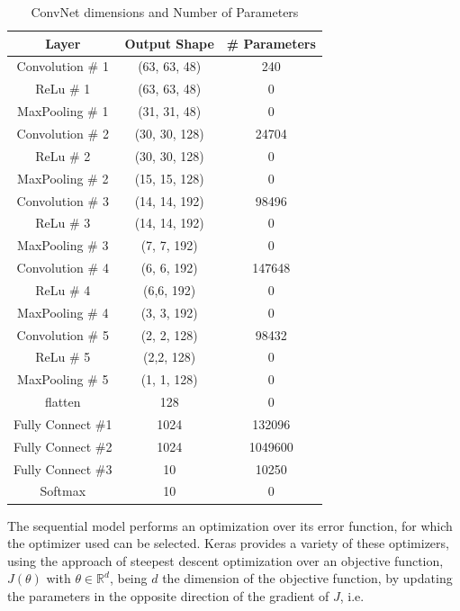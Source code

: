 \begin{table}[h!]
    \centering
    \begin{tabular}{|c|c|c|}
        \hline
        \textbf{Layer} & \textbf{Output Shape} & \textbf{\# Parameters} \\
        \hline\hline
        Convolution \# 1 & (63, 63, 48) & 240 \\\hline
        ReLu \# 1 & (63, 63, 48) & 0 \\\hline
        MaxPooling \# 1 & (31, 31, 48) & 0 \\\hline
        Convolution \# 2 & (30, 30, 128) & 24704 \\\hline
        ReLu \# 2 & (30, 30, 128) & 0 \\\hline
        MaxPooling \# 2 & (15, 15, 128) & 0 \\\hline
        Convolution \# 3 & (14, 14, 192) & 98496 \\\hline
        ReLu \# 3 & (14, 14, 192) & 0 \\\hline
        MaxPooling \# 3 & (7, 7, 192) & 0 \\\hline
        Convolution \# 4 & (6, 6, 192) & 147648 \\\hline
        ReLu \# 4 & (6,6, 192) & 0 \\\hline
        MaxPooling \# 4 & (3, 3, 192) & 0 \\\hline
        Convolution \# 5 & (2, 2, 128) & 98432 \\\hline
        ReLu \# 5 & (2,2, 128) & 0 \\\hline
        MaxPooling \# 5 & (1, 1, 128) & 0 \\\hline
        flatten & 128 & 0 \\\hline
        Fully Connect \#1 & 1024 & 132096 \\\hline
        Fully Connect \#2 & 1024 & 1049600 \\\hline
        Fully Connect \#3 & 10 & 10250 \\\hline
        Softmax & 10 & 0 \\\hline
        \hline
    \end{tabular}
    \caption{ConvNet dimensions and Number of Parameters}
    \label{table:convnet_summary}
\end{table}

The sequential model performs an optimization over its error function, for which the optimizer used can be selected. Keras provides a variety of these optimizers, using the approach of steepest descent optimization over an objective function, \(J(\theta)\) with \(\theta \in \mathbb{R}^{d}\), being \(d\) the dimension of the objective function, by updating the parameters in the opposite direction of the gradient of \(J\), i.e.

